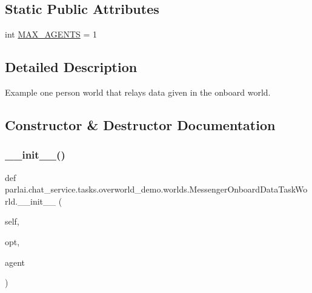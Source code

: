 \subsection*{Static Public Attributes}
\begin{DoxyCompactItemize}
\item 
int \hyperlink{classparlai_1_1chat__service_1_1tasks_1_1overworld__demo_1_1worlds_1_1MessengerOnboardDataTaskWorld_a7ed8e27cd48ad50a7625737800cc6779}{M\+A\+X\+\_\+\+A\+G\+E\+N\+TS} = 1
\end{DoxyCompactItemize}


\subsection{Detailed Description}
\begin{DoxyVerb}Example one person world that relays data given in the onboard world.
\end{DoxyVerb}
 

\subsection{Constructor \& Destructor Documentation}
\mbox{\label{classparlai_1_1chat__service_1_1tasks_1_1overworld__demo_1_1worlds_1_1MessengerOnboardDataTaskWorld_a2a6af8dfc01b563104a8ec6af83711bc}} 
\subsubsection{\texorpdfstring{\+\_\+\+\_\+init\+\_\+\+\_\+()}{\_\_init\_\_()}}
{\footnotesize\ttfamily def parlai.\+chat\+\_\+service.\+tasks.\+overworld\+\_\+demo.\+worlds.\+Messenger\+Onboard\+Data\+Task\+World.\+\_\+\+\_\+init\+\_\+\+\_\+ (\begin{DoxyParamCaption}\item[{}]{self,  }\item[{}]{opt,  }\item[{}]{agent }\end{DoxyParamCaption})}



